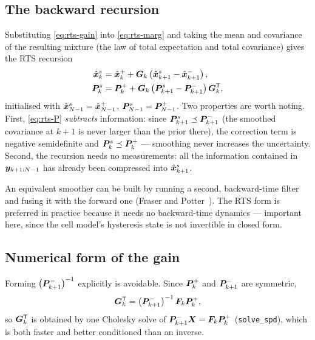 \subsection{The backward recursion}
Substituting \eqref{eq:rts-gain} into \eqref{eq:rts-marg} and taking the mean and covariance of the
resulting mixture (the law of total expectation and total covariance) gives the RTS recursion
\begin{align}
\hat{\bm{x}}^s_k &= \hat{\bm{x}}^{+}_k+\bm{G}_k\left(\hat{\bm{x}}^s_{k+1}-\hat{\bm{x}}^{-}_{k+1}\right), \label{eq:rts-x}\\
\bm{P}^s_k   &= \bm{P}^+_k+\bm{G}_k\left(\bm{P}^s_{k+1}-\bm{P}^-_{k+1}\right)\bm{G}_k^{\mathsf{T}}, \label{eq:rts-P}
\end{align}
initialised with $\hat{\bm{x}}^s_{N-1}=\hat{\bm{x}}^{+}_{N-1}$, $\bm{P}^s_{N-1}=\bm{P}^+_{N-1}$.  Two properties are worth
noting.  First, \eqref{eq:rts-P} \emph{subtracts} information: since
$\bm{P}^s_{k+1}\preceq\bm{P}^-_{k+1}$ (the smoothed covariance at $k+1$ is never larger than the prior
there), the correction term is negative semidefinite and $\bm{P}^s_k\preceq\bm{P}^+_k$ --- smoothing never
increases the uncertainty.  Second, the recursion needs no measurements: all the information
contained in $\bm{y}_{k+1:N-1}$ has already been compressed into $\hat{\bm{x}}^s_{k+1}$.

\begin{remark}
An equivalent smoother can be built by running a second, backward-time filter and fusing it with the
forward one (Fraser and Potter~\cite{fraserpotter1969}).  The RTS form is preferred in practice
because it needs no backward-time dynamics --- important here, since the cell model's hysteresis
state is not invertible in closed form.
\end{remark}

\subsection{Numerical form of the gain}
Forming $\left(\bm{P}^-_{k+1}\right)^{-1}$ explicitly is avoidable.  Since $\bm{P}^+_k$ and $\bm{P}^-_{k+1}$
are symmetric,
\begin{equation}
\bm{G}_k^{\mathsf{T}}=\left(\bm{P}^-_{k+1}\right)^{-1}\bm{F}_k\bm{P}^+_k ,
\label{eq:rts-solve}
\end{equation}
so $\bm{G}_k^{\mathsf{T}}$ is obtained by one Cholesky solve of $\bm{P}^-_{k+1}\bm{X}=\bm{F}_k\bm{P}^+_k$
(\texttt{solve\_spd}), which is both faster and better conditioned than an inverse.

